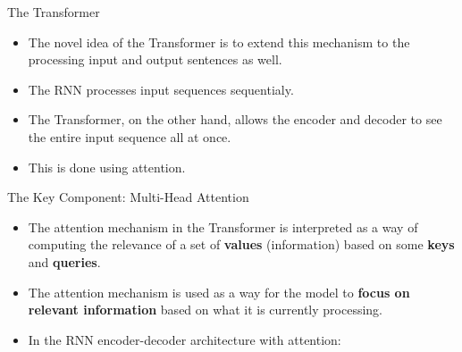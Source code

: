 \documentclass[handout]{beamer}
\begin{document}
\begin{frame}{The Transformer}
\begin{scriptsize}
\begin{itemize}
 \item The novel idea of the Transformer is to extend this mechanism to the processing input and output sentences as well.
 \item The RNN processes input sequences sequentialy. 
 \item The Transformer, on the other hand, allows the encoder and decoder to see the entire input sequence all at once.
 \item This is done using attention.
\end{itemize}



\end{scriptsize}

\end{frame}




\begin{frame}{The Key Component: Multi-Head Attention}
\begin{scriptsize}
\begin{itemize}
 \item The attention mechanism in the Transformer is interpreted as a way of computing the relevance of a set of \textbf{values} (information) based on some \textbf{keys} and \textbf{queries}. 
 
 \item The attention mechanism is used as a way for the model to \textbf{focus on relevant information} based on what it is currently processing.
 
 \item In the RNN encoder-decoder architecture with attention:
 

 \begin{enumerate}

 \end{enumerate}

 
\end{itemize}



\end{scriptsize}

\end{frame}
\end{document}
